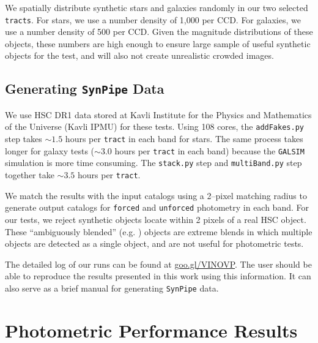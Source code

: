 \documentclass[useamsfonts]{pasj01}
\def\synpipe{\texttt{SynPipe}}
\def\forced{\texttt{forced}}
\def\unforced{\texttt{unforced}}
\def\tract{\texttt{tract}}
\def\tracts{\texttt{tracts}}
\def\galsim{\texttt{G}{\scriptsize \texttt{AL}}\texttt{S}{\scriptsize \texttt{IM}}}
\begin{document}
    We spatially distribute synthetic stars and galaxies randomly in our two selected 
    \tracts{}. 
    For stars, we use a number density of 1,000 per CCD. 
    For galaxies, we use a number density of 500 per CCD. 
    Given the magnitude distributions of these objects, these numbers are high enough 
    to ensure large sample of useful synthetic objects for the test, and will also not
    create unrealistic crowded images.


\subsection{Generating \synpipe{} Data}
    \label{ssec:running}

    We use HSC DR1 data stored at Kavli Institute for the Physics and Mathematics of 
    the Universe (Kavli IPMU) for these tests. 
    Using 108 cores, the \texttt{addFakes.py} step takes ${\sim}1.5$ hours per 
    \tract{} in each band for stars. 
    The same process takes longer for galaxy tests (${\sim}3.0$ hours per
    \tract{} in each band) because the \galsim{} simulation is more time consuming.
    The \texttt{stack.py} step and \texttt{multiBand.py} step together take 
    ${\sim}3.5$ hours per \tract{}.

    We match the results with the input catalogs using a 2--pixel matching radius
    to generate output catalogs for \forced{} and \unforced{} photometry
    in each band. 
    For our tests, we reject synthetic objects locate within 2 pixels 
    of a real HSC object. 
    These ``ambiguously blended'' (e.g. \citealt{Dawson2016}) objects are extreme 
    blends in which multiple objects are detected as a single object, and are not 
    useful for photometric tests.
    
    The detailed log of our runs can be found at \url{goo.gl/VINOVP}.
    The user should be able to reproduce the results presented in this work using 
    this information. It can also serve as a brief manual for generating \synpipe{} 
    data.


\section{Photometric Performance Results}
    \label{sec:result}
\end{document}
